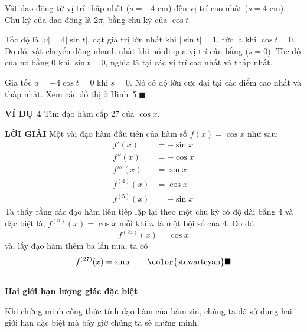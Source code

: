 \begin{minipage}[t]{0.71\textwidth}
  \vspace{0pt}
  \noindent Vật dao động từ vị trí thấp nhất ($s = -4\text{ cm}$) đến vị trí cao nhất ($s = 4\text{ cm}$). Chu kỳ của dao động là $2\pi$, bằng chu kỳ của $\cos t$.
  
  \indent Tốc độ là $|v| = 4|\sin t|$, đạt giá trị lớn nhất khi $|\sin t| = 1$, tức là khi $\cos t = 0$. Do đó, vật chuyển động nhanh nhất khi nó đi qua vị trí cân bằng ($s = 0$). Tốc độ của nó bằng $0$ khi $\sin t = 0$, nghĩa là tại các vị trí cao nhất và thấp nhất.
  
  \indent Gia tốc $a = -4\cos t = 0$ khi $s = 0$. Nó có độ lớn cực đại tại các điểm cao nhất và thấp nhất. Xem các đồ thị ở Hình~5.\hfill{\color{stewartcyan}$\blacksquare$}

  \vspace{1.1em}
  \noindent
  \textbf{\textsf{\color{stewartcyan}VÍ DỤ 4}} \quad Tìm đạo hàm cấp 27 của $\cos x$.

  \vspace{0.4em}
  \noindent
  \textbf{\textsf{\color{stewartcyan}LỜI GIẢI}} \quad Một vài đạo hàm đầu tiên của hàm số $f(x) = \cos x$ như sau:
  \begin{align*}
    f'(x) &= -\sin x \\
    f''(x) &= -\cos x \\
    f'''(x) &= \sin x \\
    f^{(4)}(x) &= \cos x \\
    f^{(5)}(x) &= -\sin x
  \end{align*}
  Ta thấy rằng các đạo hàm liên tiếp lặp lại theo một chu kỳ có độ dài bằng 4 và đặc biệt là, $f^{(n)}(x) = \cos x$ mỗi khi $n$ là một bội số của 4. Do đó
  \[
    f^{(24)}(x) = \cos x
  \]
  và, lấy đạo hàm thêm ba lần nữa, ta có
  \begin{equation*}
    f^{(27)}(x) = \sin x \tag*{{\color{stewartcyan}$\blacksquare$}}
  \end{equation*}

  \vspace{0.8em}
  \noindent
  {\color{stewartcyan}\rule{1.1ex}{1.1ex}}\hspace{0.5em}\textbf{\textsf{Hai giới hạn lượng giác đặc biệt}}

  \vspace{0.5em}
  \noindent
  Khi chứng minh công thức tính đạo hàm của hàm sin, chúng ta đã sử dụng hai giới hạn đặc biệt mà bây giờ chúng ta sẽ chứng minh.

  \vspace{0.5em}
  \noindent
  \begin{minipage}{\linewidth}
    \centering
  \end{minipage}
  \vspace{0.6em}


\end{minipage}
